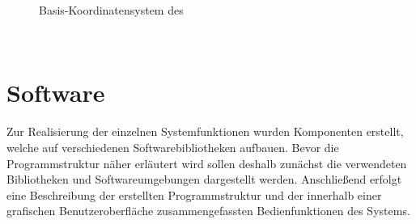 \begin{figure}[ht]
	\begin{center}%
		\caption{Basis-Koordinatensystem des }
		\label{fig.coords_kps}
	\end{center}
\end{figure}

\\



\red[Transformationen:\\
Map = World\\
World -> BaseLink -> CameraLink -> Camera\\
Camera -> Projector\\
Projector -> IntrinsicProj\\
World -> Objects\\
World -> ARMarker (eq. to Objects)\\
]

\section{Software}
Zur Realisierung der einzelnen Systemfunktionen wurden Komponenten erstellt, welche auf verschiedenen Softwarebibliotheken aufbauen.
Bevor die Programmstruktur näher erläutert wird sollen deshalb zunächst die verwendeten Bibliotheken und Softwareumgebungen dargestellt werden.
Anschließend erfolgt eine Beschreibung der erstellten Programmstruktur und der innerhalb einer grafischen Benutzeroberfläche zusammengefassten Bedienfunktionen des Systems.

